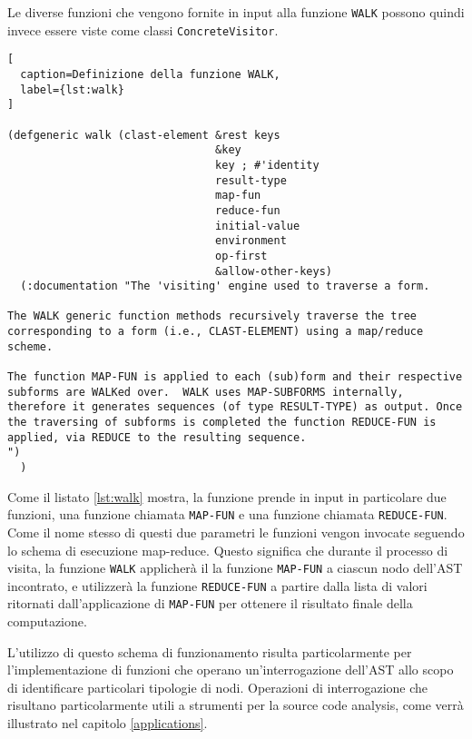 Le diverse funzioni che vengono fornite in input alla funzione \texttt{WALK}
possono quindi invece essere viste come classi \texttt{ConcreteVisitor}.\\

\begin{lstlisting}[
  caption=Definizione della funzione WALK,
  label={lst:walk}
]

(defgeneric walk (clast-element &rest keys
                                &key
                                key ; #'identity
                                result-type
                                map-fun
                                reduce-fun
                                initial-value
                                environment
                                op-first
                                &allow-other-keys)
  (:documentation "The 'visiting' engine used to traverse a form.

The WALK generic function methods recursively traverse the tree
corresponding to a form (i.e., CLAST-ELEMENT) using a map/reduce
scheme.

The function MAP-FUN is applied to each (sub)form and their respective
subforms are WALKed over.  WALK uses MAP-SUBFORMS internally,
therefore it generates sequences (of type RESULT-TYPE) as output. Once
the traversing of subforms is completed the function REDUCE-FUN is
applied, via REDUCE to the resulting sequence.
")
  )

\end{lstlisting}

Come il listato \ref{lst:walk} mostra, la funzione prende in input in
particolare due funzioni, una funzione chiamata \texttt{MAP-FUN} e una funzione
chiamata \texttt{REDUCE-FUN}. Come il nome stesso di questi due parametri le
funzioni vengon invocate seguendo lo schema di esecuzione map-reduce. Questo
significa che durante il processo di visita, la funzione \texttt{WALK}
applicherà il la funzione \texttt{MAP-FUN} a ciascun nodo dell'AST incontrato, e
utilizzerà la funzione \texttt{REDUCE-FUN} a partire dalla lista di valori
ritornati dall'applicazione di \texttt{MAP-FUN} per ottenere il risultato finale
della computazione.

L'utilizzo di questo schema di funzionamento risulta particolarmente per
l'implementazione di funzioni che operano un'interrogazione dell'AST allo scopo
di identificare particolari tipologie di nodi. Operazioni di interrogazione che
risultano particolarmente utili a strumenti per la source code analysis, come
verrà illustrato nel capitolo \ref{applications}.\\

